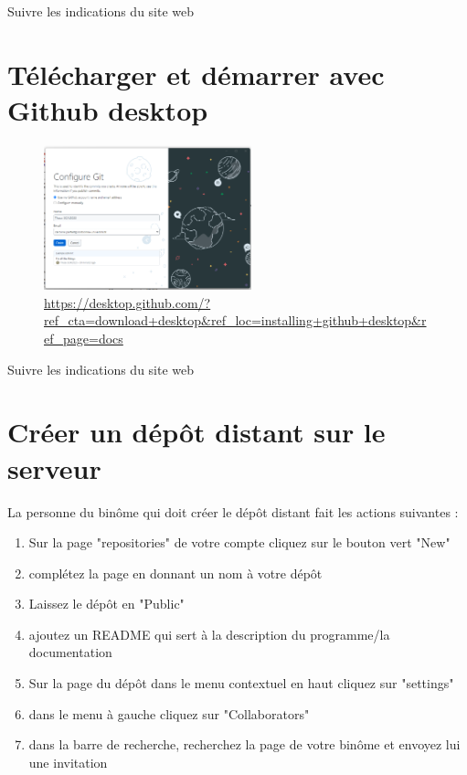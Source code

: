  Suivre les indications du site web


\vspace{0.5cm}
\section{Télécharger et démarrer avec Github desktop}
\vspace{0.5cm}

\begin{figure}[H]
\caption{\url{https://desktop.github.com/?ref_cta=download+desktop&ref_loc=installing+github+desktop&ref_page=docs}}
  \includegraphics[width=6cm]{images/github_desktop_connect.png}
  
  \end{figure}

 Suivre les indications du site web



\section{Créer un dépôt distant sur le serveur}
La personne du binôme qui doit créer le dépôt distant fait les actions suivantes :

\begin{enumerate}
\item Sur la page "repositories" de votre compte cliquez sur le bouton vert "New"
\item complétez la page en donnant un nom à votre dépôt
\item Laissez le dépôt en "Public"
\item ajoutez un README qui sert à la description du programme/la documentation
\item Sur la page du dépôt dans le menu contextuel en haut cliquez sur "settings"
\item dans le menu à gauche cliquez sur "Collaborators"
\item dans la barre de recherche, recherchez la page de votre binôme et envoyez lui une invitation 
\end{enumerate}


